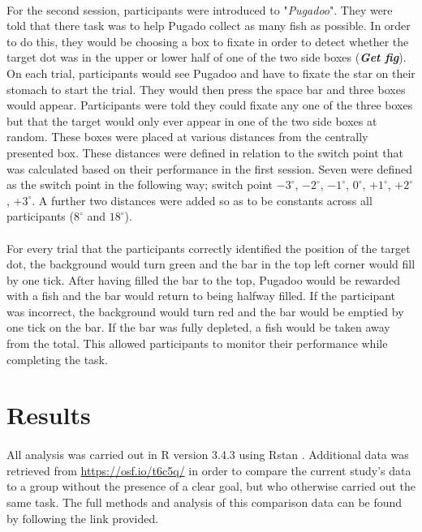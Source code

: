 \documentclass[12pt]{article}
\begin{document}
\paragraph{} For the second session, participants were introduced to "\textit{Pugadoo}". They were told that there task was to help Pugado collect as many fish as possible. In order to do this, they would be choosing a box to fixate in order to detect whether the target dot was in the upper or lower half of one of the two side boxes (\textit{\textbf{Get fig}}). On each trial, participants would see Pugadoo and have to fixate the star on their stomach to start the trial. They would then press the space bar and three boxes would appear. Participants were told they could fixate any one of the three boxes but that the target would only ever appear in one of the two side boxes at random. These boxes were placed at various distances from the centrally presented box. These distances were defined in relation to the switch point that was calculated based on their performance in the first session. Seven were defined as the switch point in the following way; switch point $-3^{\circ}$, $-2^{\circ}$, $-1^{\circ}$, $0^{\circ}$, $+1^{\circ}$, $+2^{\circ}$, $+3^{\circ}$. A further two distances were added so as to be constants across all participants ($8^{\circ}$ and $18^{\circ}$). 

\paragraph{} For every trial that the participants correctly identified the position of the target dot, the background would turn green and the bar in the top left corner would fill by one tick. After having filled the bar to the top, Pugadoo would be rewarded with a fish and the bar would return to being halfway filled. If the participant was incorrect, the background would turn red and the bar would be emptied by one tick on the bar. If the bar was fully depleted, a fish would be taken away from the total. This allowed participants to monitor their performance while completing the task. 

\section*{Results}
\paragraph{} All analysis was carried out in R version 3.4.3 \citep{R} using Rstan \citep{Rstan,Stan}. Additional data was retrieved from \url{https://osf.io/t6c5q/} in order to compare the current study's data to a group without the presence of a clear goal, but who otherwise carried out the same task. The full methods and analysis of this comparison data can be found by following the link provided. 
\end{document}
